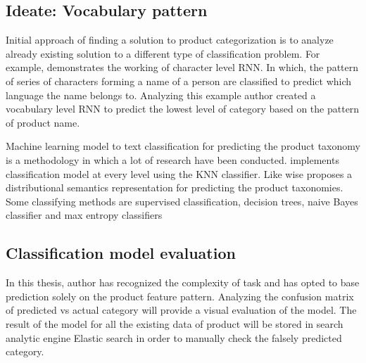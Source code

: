 
\subsection{Ideate: Vocabulary pattern}
Initial approach of finding a solution to product categorization is to analyze already existing solution to a different type of classification problem. For example, \parencite{sean} demonstrates the working of character level RNN. In which, the pattern of series of characters forming a name of a person are classified to predict which language the name belongs to. Analyzing this example author created a vocabulary level RNN to predict the lowest level of category based on the pattern of product name.

Machine learning model to text classification for predicting the product taxonomy is a methodology in which a lot of research have been conducted. \cite{AliCevahir.} implements classification model at every level using the \acl*{KNN} classifier. Like wise \parencite{Gupta.20062016}  proposes a distributional semantics representation for predicting the product taxonomies.  Some classifying methods are supervised classification, decision trees, naive Bayes classifier and max entropy classifiers \parencite{BirdKleinLoper09}

\subsection{Classification model evaluation}

In this thesis, author has recognized the complexity of task and has opted to base prediction solely on the product feature pattern. Analyzing the confusion matrix of predicted vs actual category will provide a visual evaluation of the model. The result of the model for all the existing data of product will be stored in search analytic engine Elastic search in order to manually check the falsely predicted category.

